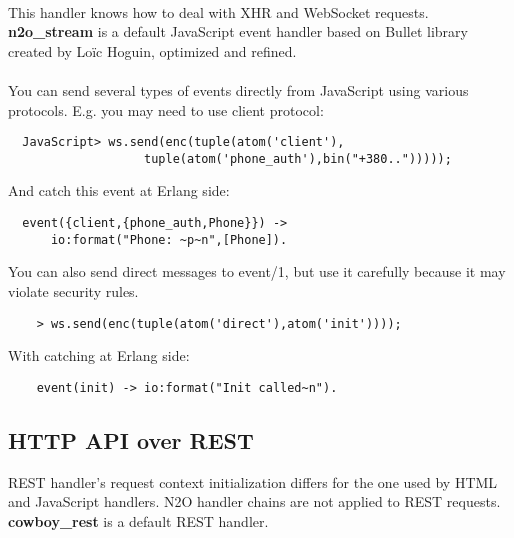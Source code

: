\paragraph{}
This handler knows how to deal with XHR and WebSocket requests.
{\bf {n2o}\_{stream}} is a default JavaScript event handler
based on Bullet library created by Loïc Hoguin, optimized and refined.

\paragraph{}
You can send several types of events directly from JavaScript
using various protocols. E.g. you may need to use client protocol:

\vspace{1\baselineskip}
\begin{lstlisting}
  JavaScript> ws.send(enc(tuple(atom('client'),
                   tuple(atom('phone_auth'),bin("+380..")))));
\end{lstlisting}
\vspace{1\baselineskip}

And catch this event at Erlang side:

\vspace{1\baselineskip}
\begin{lstlisting}
  event({client,{phone_auth,Phone}}) ->
      io:format("Phone: ~p~n",[Phone]).
\end{lstlisting}
\vspace{1\baselineskip}

You can also send direct messages to event/1, but use it carefully
because it may violate security rules.

\vspace{1\baselineskip}
\begin{lstlisting}
    > ws.send(enc(tuple(atom('direct'),atom('init'))));
\end{lstlisting}
\vspace{1\baselineskip}

With catching at Erlang side:

\vspace{1\baselineskip}
\begin{lstlisting}
    event(init) -> io:format("Init called~n").
\end{lstlisting}
\vspace{1\baselineskip}

\newpage
\subsection{HTTP API over REST}
REST handler's request context initialization differs for the one
used by HTML and JavaScript handlers. N2O handler chains are not
applied to REST requests. {\bf cowboy\_rest} is a default REST
handler.

